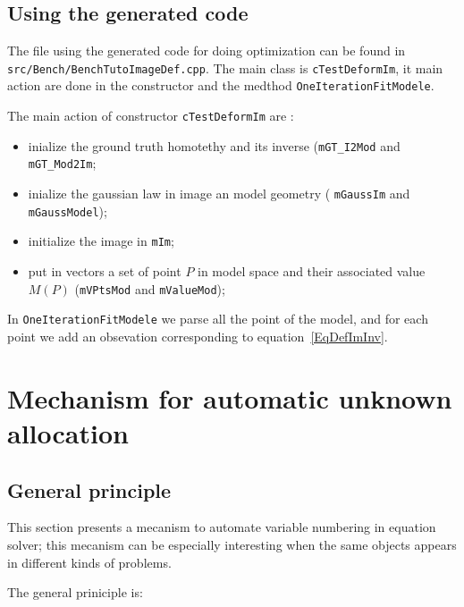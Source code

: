 \subsection{Using the generated code}

The file using the generated code for doing optimization can be found in 
{\tt src/Bench/BenchTutoImageDef.cpp}.  The main class is {\tt cTestDeformIm},
it main action are done in the constructor and the medthod {\tt OneIterationFitModele}.

The main action of constructor {\tt cTestDeformIm} are :

\begin{itemize}
    \item  inialize the ground truth homotethy and its inverse ({\tt mGT\_I2Mod} and {\tt mGT\_Mod2Im};
    \item  inialize the gaussian law in image an model geometry ( {\tt mGaussIm}  and {\tt mGaussModel});
    \item  initialize the image  in {\tt mIm}; 
    \item  put in vectors a set of point $P$ in model space and their associated value $M(P)$
           ({\tt mVPtsMod} and {\tt mValueMod});
\end{itemize}


In {\tt OneIterationFitModele} we parse all the point of the model, and for each point we
add an obsevation corresponding to equation~\ref{EqDefImInv}.


\section{Mechanism for automatic unknown allocation}

\label{SecAutoUkAlloc}


\subsection{General principle}

This section presents a mecanism to automate variable numbering in 
equation solver; this mecanism can be especially interesting when the same objects 
appears in different kinds of problems.

The general priniciple is:

